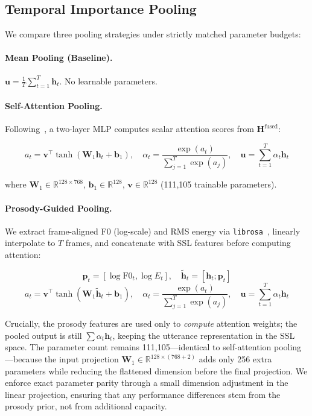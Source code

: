 \subsection{Temporal Importance Pooling}
\label{ssec:pooling}

We compare three pooling strategies under strictly matched parameter budgets:

\paragraph{Mean Pooling (Baseline).}
$\mathbf{u} = \frac{1}{T}\sum_{t=1}^{T} \mathbf{h}_t$. No learnable parameters.

\paragraph{Self-Attention Pooling.}
Following~\cite{lin2017structured}, a two-layer MLP computes scalar attention
scores from $\mathbf{H}^{\text{fused}}$:

\begin{equation}
a_t = \mathbf{v}^\top \tanh(\mathbf{W}_1 \mathbf{h}_t + \mathbf{b}_1), \quad
\alpha_t = \frac{\exp(a_t)}{\sum_{j=1}^{T} \exp(a_j)}, \quad
\mathbf{u} = \sum_{t=1}^{T} \alpha_t \mathbf{h}_t
\end{equation}

where $\mathbf{W}_1 \in \mathbb{R}^{128 \times 768}$, $\mathbf{b}_1 \in \mathbb{R}^{128}$,
$\mathbf{v} \in \mathbb{R}^{128}$ (111,105 trainable parameters).

\paragraph{Prosody-Guided Pooling.}
We extract frame-aligned F0 (log-scale) and RMS energy via
\texttt{librosa}~\cite{mcfee2015librosa}, linearly interpolate to $T$ frames,
and concatenate with SSL features before computing attention:

\begin{equation}
\mathbf{p}_t = [\log\text{F0}_t, \log E_t], \quad
\tilde{\mathbf{h}}_t = [\mathbf{h}_t; \mathbf{p}_t]
\end{equation}
\begin{equation}
a_t = \mathbf{v}^\top \tanh(\mathbf{W}_1 \tilde{\mathbf{h}}_t + \mathbf{b}_1), \quad
\alpha_t = \frac{\exp(a_t)}{\sum_{j=1}^{T} \exp(a_j)}, \quad
\mathbf{u} = \sum_{t=1}^{T} \alpha_t \mathbf{h}_t
\end{equation}

Crucially, the prosody features are used only to \textit{compute} attention
weights; the pooled output is still $\sum \alpha_t \mathbf{h}_t$, keeping the
utterance representation in the SSL space. The parameter count remains
111,105---identical to self-attention pooling---because the input projection
$\mathbf{W}_1 \in \mathbb{R}^{128 \times (768+2)}$ adds only 256 extra
parameters while reducing the flattened dimension before the final projection.
We enforce exact parameter parity through a small dimension adjustment in the
linear projection, ensuring that any performance differences stem from the
prosody prior, not from additional capacity.

